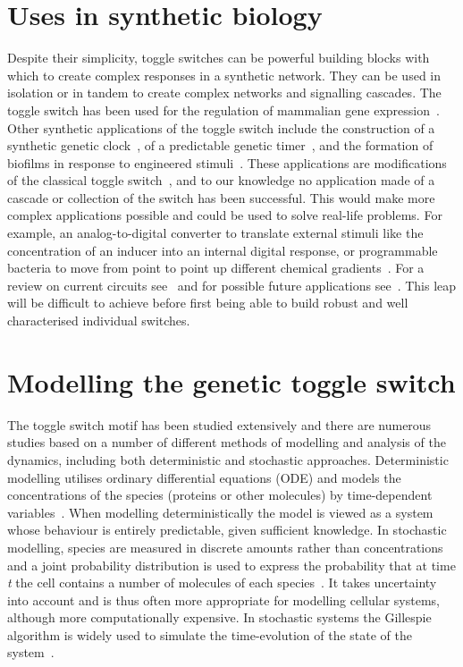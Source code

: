 \section{Uses in synthetic biology}
Despite their simplicity, toggle switches can be powerful building blocks with which to create complex responses in a synthetic network. They can be used in isolation or in tandem to create complex networks and signalling cascades. The toggle switch has been used for the regulation of mammalian gene expression~\autocite{Deans:2007cy, Kramer:2004kq}. Other synthetic applications of the toggle switch include the construction of a synthetic genetic clock~\autocite{Atkinson:2003tu}, of a predictable genetic timer~\autocite{Ellis:2009hka}, and the formation of biofilms in response to engineered stimuli~\autocite{Kobayashi:2004cv}. These applications are modifications of the classical toggle switch~\autocite{Gardner:2000vha}, and to our knowledge no application made of a cascade or collection of the switch has been successful. This would make more complex applications possible and could be used to solve real-life problems. For example, an analog-to-digital converter to translate external stimuli like the concentration of an inducer into an internal digital response, or programmable bacteria to move from point to point up different chemical gradients~\autocite{Lu:2009ez}. For a review on current circuits see~\autocite{Khalil:2010hm} and for possible future applications see~\autocite{Lu:2009ez}. This leap will be difficult to achieve before first being able to build robust and well characterised individual switches.

\section{Modelling the genetic toggle switch} 
The toggle switch motif has been studied extensively and there are numerous studies based on a number of different methods of modelling and analysis of the dynamics, including both deterministic and stochastic approaches. Deterministic modelling utilises ordinary differential equations (ODE) and models the concentrations of the species (proteins or other molecules) by time-dependent variables~\autocite{deJong:2002ft}. When modelling deterministically the model is viewed as a system whose behaviour is entirely predictable, given sufficient knowledge. In stochastic modelling, species are measured in discrete amounts rather than concentrations and a joint probability distribution is used to express the probability that at time \textit{t} the cell contains a number of molecules of each species~\autocite{deJong:2002ft,Wilkinson:2006td}. It takes uncertainty into account and is thus often more appropriate for modelling cellular systems, although more computationally expensive. In stochastic systems the Gillespie algorithm is widely used to simulate the time-evolution of the state of the system~\autocite{Warren:2005kea}.


